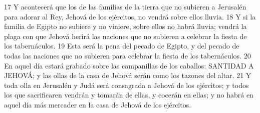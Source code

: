 17 Y acontecerá que los de las familias de la tierra que no subieren a Jerusalén para adorar al Rey, Jehová de los ejércitos, no vendrá sobre ellos lluvia.
18 Y si la familia de Egipto no subiere y no viniere, sobre ellos no habrá lluvia; vendrá la plaga con que Jehová herirá las naciones que no subieren a celebrar la fiesta de los tabernáculos.
19 Esta será la pena del pecado de Egipto, y del pecado de todas las naciones que no subieren para celebrar la fiesta de los tabernáculos.
20 En aquel día estará grabado sobre las campanillas de los caballos: SANTIDAD A JEHOVÁ; y las ollas de la casa de Jehová serán como los tazones del altar.
21 Y toda olla en Jerusalén y Judá será consagrada a Jehová de los ejércitos; y todos los que sacrificaren vendrán y tomarán de ellas, y cocerán en ellas; y no habrá en aquel día más mercader en la casa de Jehová de los ejércitos.

